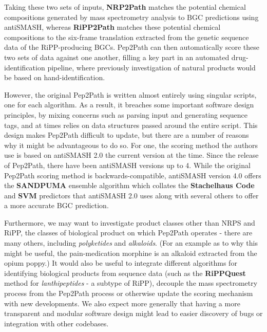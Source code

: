 \documentclass{l4proj}
\newcommand{\cit}[1]{\citep{#1}}
\begin{document}
Taking these two sets of inputs, \textbf{NRP2Path} matches the potential chemical compositions generated by mass spectrometry analysis to BGC predictions using antiSMASH, whereas \textbf{RiPP2Path} matches these potential chemical compositions to the six-frame translation extracted from the genetic sequence data of the RiPP-producing BGCs. Pep2Path can then automatically score these two sets of data against one another, filling a key part in an automated drug-identification pipeline, where previously investigation of natural products would be based on hand-identification.

However, the original Pep2Path is written almost entirely using singular scripts, one for each algorithm. As a result, it breaches some important software design principles, by mixing concerns such as parsing input and generating sequence tags, and at times relies on data structures passed around the entire script. This design makes Pep2Path difficult to update, but there are a number of reasons why it might be advantageous to do so. For one, the scoring method the authors use is based on antiSMASH 2.0 \cit{as2} the current version at the time. Since the release of Pep2Path, there have been antiSMASH versions up to 4. \cit{as4} While the original Pep2Path scoring method is backwards-compatible, antiSMASH version 4.0 offers the \textbf{SANDPUMA} ensemble algorithm \cit{sandpuma} which collates the \textbf{Stachelhaus Code} and \textbf{SVM} predictors that antiSMASH 2.0 uses along with several others to offer a more accurate BGC prediction.

Furthermore, we may want to investigate product classes other than NRPS and RiPP, the classes of biological product on which Pep2Path operates - there are many others, including \textit{polyketides} and \textit{alkaloids}. (For an example as to why this might be useful, the pain-medication morphine is an alkaloid extracted from the opium poppy.) It would also be useful to integrate different algorithms for identifying biological products from sequence data (such as the \textbf{RiPPQuest} \cit{rippq} method for \textit{lanthipeptides} - a subtype of RiPP), decouple the mass spectrometry process from the Pep2Path process or otherwise update the scoring mechanism with new developments. We also expect more generally that having a more transparent and modular software design might lead to easier discovery of bugs or integration with other codebases.

\end{document}
